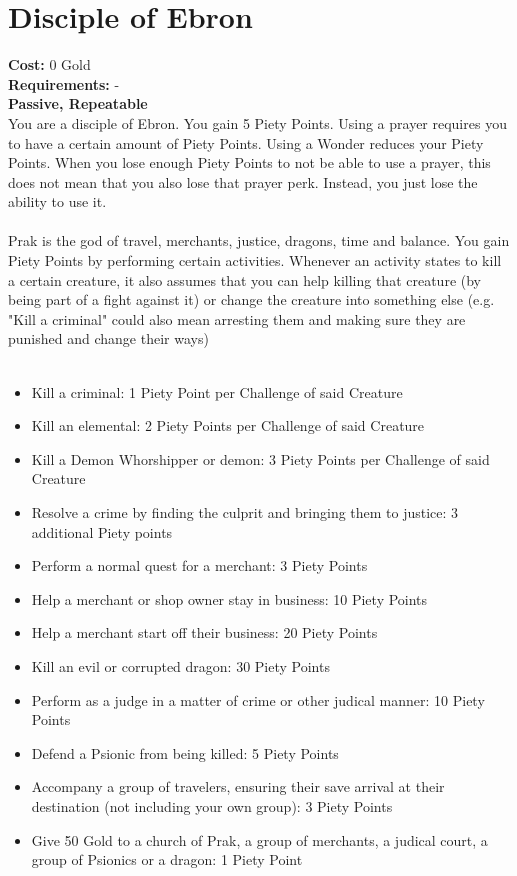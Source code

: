 \section{Disciple of Ebron}
\textbf{Cost:} 0 Gold\\
\textbf{Requirements:} - \\
\textbf{Passive, Repeatable}\\
You are a disciple of Ebron. You gain 5 Piety Points. Using a prayer requires you to have a certain amount of Piety Points. Using a Wonder reduces your Piety Points. When you lose enough Piety Points to not be able to use a prayer, this does not mean that you also lose that prayer perk. Instead, you just lose the ability to use it.\\
\\
Prak is the god of travel, merchants, justice, dragons, time and balance. You gain Piety Points by performing certain activities. Whenever an activity states to kill a certain creature, it also assumes that you can help killing that creature (by being part of a fight against it) or change the creature into something else (e.g. "Kill a criminal" could also mean arresting them and making sure they are punished and change their ways)\\
\\
\begin{itemize}
	\item Kill a criminal: 1 Piety Point per Challenge of said Creature
	\item Kill an elemental: 2 Piety Points per Challenge of said Creature
	\item Kill a Demon Whorshipper or demon: 3 Piety Points per Challenge of said Creature
	\item Resolve a crime by finding the culprit and bringing them to justice: 3 additional Piety points
	\item Perform a normal quest for a merchant: 3 Piety Points
	\item Help a merchant or shop owner stay in business: 10 Piety Points
	\item Help a merchant start off their business: 20 Piety Points
	\item Kill an evil or corrupted dragon: 30 Piety Points
	\item Perform as a judge in a matter of crime or other judical manner: 10 Piety Points
	\item Defend a Psionic from being killed: 5 Piety Points
	\item Accompany a group of travelers, ensuring their save arrival at their destination (not including your own group): 3 Piety Points
	\item Give 50 Gold to a church of Prak, a group of merchants, a judical court, a group of Psionics or a dragon: 1 Piety Point
\end{itemize}

